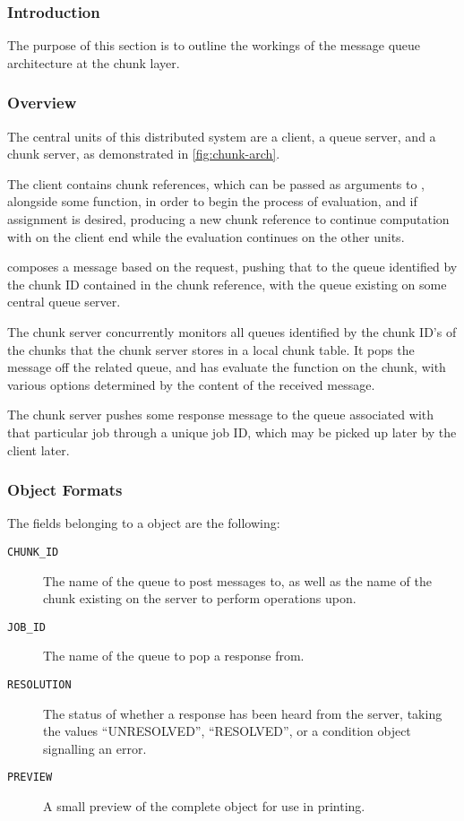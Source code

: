 \subsubsection{Introduction}

The purpose of this section is to outline the workings of the message queue
architecture at the chunk layer.

\subsubsection{Overview}

The central units of this distributed system are a client, a queue server, and
a chunk server, as demonstrated in \cref{fig:chunk-arch}.

The client contains chunk references, which can be passed as arguments to
, alongside some function, in order to begin the
process of evaluation, and if assignment is desired, producing a new chunk
reference to continue computation with on the client end while the evaluation
continues on the other units.

 composes a message based on the request, pushing that
to the queue identified by the chunk ID contained in the chunk reference, with
the queue existing on some central queue server.

The chunk server concurrently monitors all queues identified by the chunk ID's
of the chunks that the chunk server stores in a local chunk table.
It pops the message off the related queue, and has 
evaluate the function on the chunk, with various options determined by the
content of the received message.

The chunk server pushes some response message to the queue associated with that
particular job through a unique job ID, which may be picked up later by the
client later.


\subsubsection{Object Formats}
The fields belonging to a  object are the following:
\begin{description}
	\item[\texttt{CHUNK\_ID}] The name of the queue to post messages to, as
		well as the name of the chunk existing on the server to perform
		operations upon.
	\item[\texttt{JOB\_ID}] The name of the queue to pop a response from.
	\item[\texttt{RESOLUTION}] The status of whether a response has been
		heard from the server, taking the values ``UNRESOLVED'',
		``RESOLVED'', or a condition object signalling an error.
	\item[\texttt{PREVIEW}] A small preview of the complete object for use
		in printing.
\end{description}

